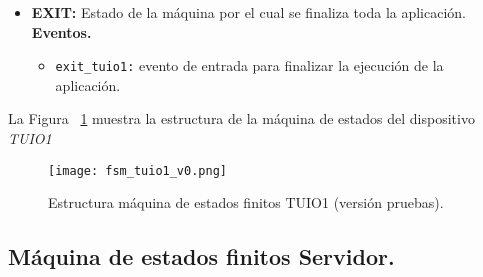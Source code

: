 \begin{itemize}
\item \textbf{EXIT:} Estado de la máquina por el cual se finaliza toda la aplicación.\\
\textbf{Eventos.}
\begin{itemize}
\item \texttt{exit\_tuio1:} evento de entrada para finalizar la ejecución de la aplicación.
\end{itemize}
\end{itemize}

La Figura ~\ref{fig:tuio1fsmv0} muestra la estructura de la máquina de estados del dispositivo \emph{TUIO1}

\begin{figure}[!h]
\begin{center}
\texttt{[image: fsm\_tuio1\_v0.png]}
\caption{Estructura máquina de estados finitos TUIO1 (versión pruebas).}
\label{fig:tuio1fsmv0}
\end{center}
\end{figure}



\subsection{Máquina de estados finitos Servidor.}

